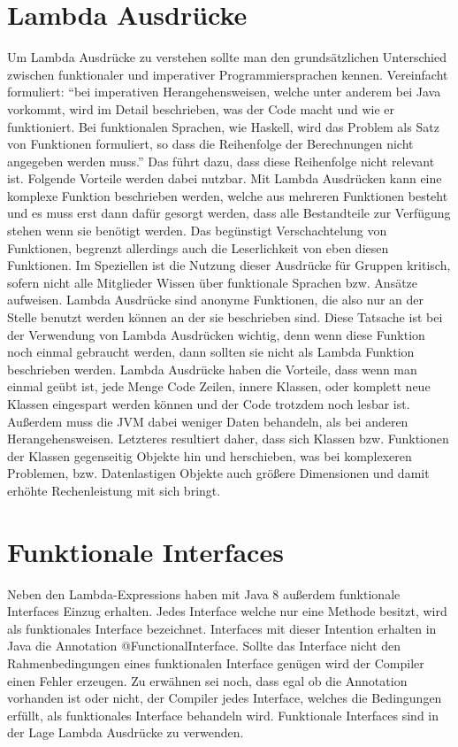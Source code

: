\section{Lambda Ausdrücke}
\label{sec:Lambda}
Um Lambda Ausdrücke zu verstehen sollte man den grundsätzlichen Unterschied
zwischen funktionaler und imperativer Programmiersprachen kennen. Vereinfacht
formuliert: "`bei imperativen Herangehensweisen, welche unter anderem bei Java
vorkommt, wird im Detail beschrieben, was der Code macht und wie er
funktioniert.
Bei funktionalen Sprachen, wie Haskell, wird das Problem als Satz von
Funktionen formuliert, so dass die Reihenfolge der Berechnungen nicht angegeben
werden muss."' Das führt dazu, dass diese Reihenfolge nicht relevant
ist.
Folgende Vorteile werden dabei nutzbar. Mit Lambda Ausdrücken kann eine komplexe
Funktion beschrieben werden, welche aus mehreren Funktionen besteht und es muss erst
dann dafür gesorgt werden, dass alle Bestandteile zur Verfügung stehen wenn sie
benötigt werden. Das begünstigt Verschachtelung von Funktionen, begrenzt
allerdings auch die Leserlichkeit von eben diesen Funktionen. Im Speziellen ist
die Nutzung dieser Ausdrücke für Gruppen kritisch, sofern nicht alle
Mitglieder Wissen über funktionale Sprachen bzw.
Ansätze aufweisen.
Lambda Ausdrücke sind anonyme Funktionen, die also nur an der Stelle benutzt
werden können an der sie beschrieben sind. Diese Tatsache ist bei der Verwendung
von Lambda Ausdrücken wichtig, denn wenn diese Funktion
noch einmal gebraucht werden, dann sollten sie nicht als Lambda Funktion
beschrieben werden.
Lambda Ausdrücke haben die Vorteile, dass wenn man einmal geübt ist, jede Menge
Code Zeilen, innere Klassen, oder komplett neue Klassen eingespart werden können
und der Code trotzdem noch lesbar ist. Außerdem muss die JVM dabei weniger Daten
behandeln, als bei anderen Herangehensweisen. Letzteres resultiert daher, dass
sich Klassen bzw. Funktionen der Klassen gegenseitig Objekte hin und
herschieben, was bei komplexeren Problemen, bzw. Datenlastigen Objekte auch größere Dimensionen und damit erhöhte Rechenleistung mit sich bringt.

\section{Funktionale Interfaces}
\label{sec:FI}
Neben den Lambda-Expressions haben mit Java 8 außerdem funktionale Interfaces
Einzug erhalten. Jedes Interface welche nur eine Methode besitzt, wird als
funktionales Interface bezeichnet. Interfaces mit dieser Intention erhalten in
Java die Annotation @FunctionalInterface. Sollte das Interface nicht den
Rahmenbedingungen eines funktionalen Interface genügen wird der Compiler einen
Fehler erzeugen. Zu erwähnen sei noch, dass egal ob die Annotation vorhanden ist
oder nicht, der Compiler jedes Interface, welches die Bedingungen erfüllt,
als funktionales Interface behandeln wird.
Funktionale Interfaces sind in der Lage Lambda Ausdrücke zu verwenden.


